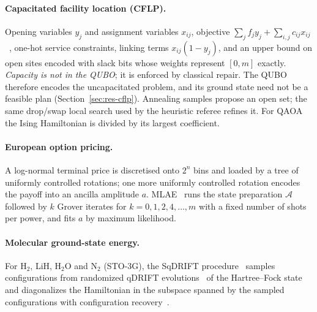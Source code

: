 \documentclass[11pt,a4paper]{article}
\begin{document}
\paragraph{Capacitated facility location (CFLP).} Opening variables $y_j$ and
assignment variables $x_{ij}$, objective
$\sum_j f_j y_j + \sum_{i,j} c_{ij} x_{ij}$~\cite{owen1998}, one-hot service
constraints, linking terms $x_{ij}(1 - y_j)$, and an upper bound on open sites
encoded with slack bits whose weights represent $[0, m]$ exactly.
\emph{Capacity is not in the QUBO}; it is enforced by classical repair. The
QUBO therefore encodes the uncapacitated problem, and its ground state need
not be a feasible plan (Section~\ref{sec:res-cflp}). Annealing samples propose
an open set; the same drop/swap local search used by the heuristic referee
refines it. For QAOA the Ising Hamiltonian is divided by its largest
coefficient.

\paragraph{European option pricing.} A log-normal terminal price is
discretised onto $2^n$ bins and loaded by a tree of uniformly controlled
rotations; one more uniformly controlled rotation encodes the payoff into an
ancilla amplitude $a$. MLAE~\cite{suzuki2020} runs the state preparation
$\mathcal A$ followed by $k$ Grover iterates for $k = 0, 1, 2, 4, \dots, m$
with a fixed number of shots per power, and fits $a$ by maximum likelihood.

\paragraph{Molecular ground-state energy.} For H$_2$, LiH, H$_2$O and N$_2$
(STO-3G), the SqDRIFT procedure~\cite{sqdrift2025} samples configurations from
randomized qDRIFT evolutions~\cite{campbell2019} of the Hartree--Fock state
and diagonalizes the Hamiltonian in the subspace spanned by the sampled
configurations with configuration recovery~\cite{kanno2023,robledo2024}.
\end{document}
